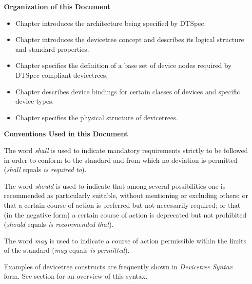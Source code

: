\documentclass[a4paper,10pt,oneside]{sphinxmanual}
\begin{document}
\textbf{Organization of this Document}
\begin{itemize}
\item {} 
Chapter {\hyperref[introduction:chapter\string-introduction]{}} introduces the architecture being
specified by DTSpec.

\item {} 
Chapter {\hyperref[devicetree\string-basics:chapter\string-devicetree]{}} introduces the devicetree concept
and describes its logical structure and standard properties.

\item {} 
Chapter {\hyperref[devicenodes:chapter\string-device\string-node\string-requirements]{}} specifies the
definition of a base set of device nodes required by DTSpec-compliant
devicetrees.

\item {} 
Chapter {\hyperref[device\string-bindings:chapter\string-device\string-bindings]{}} describes device bindings for
certain classes of devices and specific device types.

\item {} 
Chapter {\hyperref[flattened\string-format:chapter\string-fdt\string-structure]{}} specifies the physical structure
of devicetrees.

\end{itemize}

\textbf{Conventions Used in this Document}

The word \emph{shall} is used to indicate mandatory requirements strictly to
be followed in order to conform to the standard and from which no
deviation is permitted (\emph{shall} equals \emph{is required to}).

The word \emph{should} is used to indicate that among several possibilities
one is recommended as particularly suitable, without mentioning or
excluding others; or that a certain course of action is preferred but
not necessarily required; or that (in the negative form) a certain
course of action is deprecated but not prohibited (\emph{should} equals \emph{is
recommended that}).

The word \emph{may} is used to indicate a course of action permissible within
the limits of the standard (\emph{may} equals \emph{is permitted}).

Examples of devicetree constructs are frequently shown in \emph{Devicetree
Syntax} form. See section {\hyperref[source\string-language:chapter\string-devicetree\string-source\string-format]{}} for
an overview of this syntax.
\end{document}
